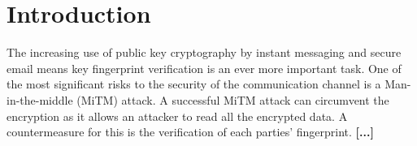 \chapter{Introduction}
\label{cha:Introduction}

The increasing use of public key cryptography by instant messaging and secure email means key fingerprint 
verification is an ever more important task. One of the most significant risks to the security of the communication channel is a Man-in-the-middle (MiTM) attack. A successful MiTM attack can circumvent the encryption as it allows an attacker to read all the encrypted data. A countermeasure for this is the verification of each parties' fingerprint. \textbf{[...]}